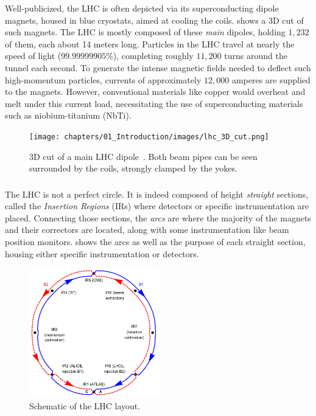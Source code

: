 Well-publicized, the LHC is often depicted via its superconducting dipole magnets, housed in blue
cryostats, aimed at cooling the coils.  shows a 3D cut of such magnets. The
LHC is mostly composed of these \textit{main} dipoles, holding $1,232$ of them, each about 14 meters
long. 
Particles in the LHC travel at nearly the speed of light ($99.99999905\%$), completing roughly
$11,200$ turns around the tunnel each second. To generate the intense magnetic fields needed to
deflect such high-momentum particles, currents of approximately $12,000$ amperes are supplied to the
magnets.  However, conventional materials like copper would overheat and melt under this current
load, necessitating the use of superconducting materials such as niobium-titanium (NbTi).


\begin{figure}[!htb]
    \centering
    \texttt{[image: chapters/01\_Introduction/images/lhc\_3D\_cut.png]}
    \caption{3D cut of a main LHC dipole~\cite{noauthor_cern_nodate}. Both beam pipes can be seen
    surrounded by the coils, strongly clamped by the yokes.}
    \label{fig:3d_cut_dipole}
\end{figure}


\subsubsection{}

The LHC is not a perfect circle. It is indeed composed of height \textit{straight} sections, called
the \textit{Insertion Regions} (IRs) where detectors or specific instrumentation are placed.
Connecting those sections, the \textit{arcs} are where the majority of the magnets and their
correctors are located, along with some instrumentation like beam position monitors.
 shows the arcs as well as the purpose of each straight section,
housing either specific instrumentation or detectors.

\begin{figure}[!htb]
    \centering
    \includegraphics[width=0.5\textwidth]{./images/irs.png}
    \caption{Schematic of the LHC layout.}
    \label{fig:introduction:lhc_irs}
\end{figure}


